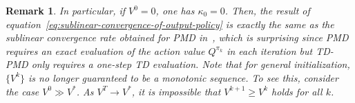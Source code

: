 \documentclass[10pt]{article}
\theoremstyle{plain}
\newtheorem{remark}{Remark}[section]
\theoremstyle{definition}
\begin{document}

\begin{remark}
In particular, if $V^0 = 0$, one has $\kappa_0=0$. Then, the result of equation~\eqref{eq:sublinear-convergence-of-output-policy} is exactly the same as the sublinear convergence rate obtained for PMD in~\textup{\cite{Xiao_2022}}, which is surprising since PMD requires an exact evaluation of the action value $Q^{\pi_k}$ in each iteration but TD-PMD only requires a one-step TD evaluation. 
    Note that for  general initialization, $\{V^k\}$ is no longer guaranteed to be a monotonic sequence. To see this, consider the case $V^0 \gg V^*$. As $V^T \to V^*$, it is impossible that $V^{k+1} \geq V^k$ holds for all $k$.
\end{remark}
\end{document}
